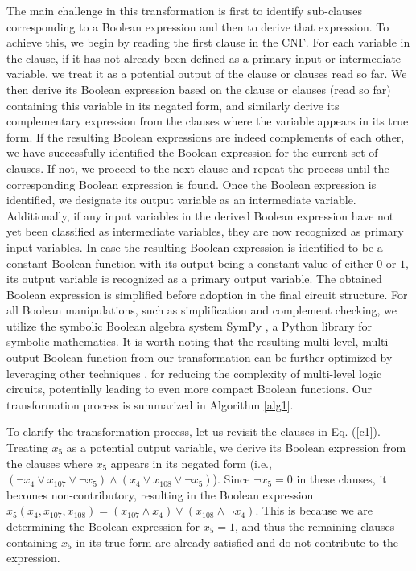 The main challenge in this transformation is first to identify sub-clauses corresponding to a Boolean expression and then to derive that expression. To achieve this, we begin by reading the first clause in the CNF. For each variable in the clause, if it has not already been defined as a primary input or intermediate variable, we treat it as a potential output of the clause or clauses read so far. We then derive its Boolean expression based on the clause or clauses (read so far) containing this variable in its negated form, and similarly derive its complementary expression from the clauses where the variable appears in its true form. If the resulting Boolean expressions are indeed complements of each other, we have successfully identified the Boolean expression for the current set of clauses. If not, we proceed to the next clause and repeat the process until the corresponding Boolean expression is found. Once the Boolean expression is identified, we designate its output variable as an intermediate variable. Additionally, if any input variables in the derived Boolean expression have not yet been classified as intermediate variables, they are now recognized as primary input variables. In case the resulting Boolean expression is identified to be a constant Boolean function with its output being a constant value of either $0$ or $1$, its output variable is recognized as a primary output variable. The obtained Boolean expression is simplified before adoption in the final circuit structure. For all Boolean manipulations, such as simplification and complement checking, we utilize the symbolic Boolean algebra system SymPy \cite{sympy}, a Python library for symbolic mathematics. It is worth noting that the resulting multi-level, multi-output Boolean function from our transformation can be further optimized by leveraging other techniques \cite{Robert2010ABC, Alan2006synthesis, Alan2011synthesis}, for reducing the complexity of multi-level logic circuits, potentially leading to even more compact Boolean functions. Our transformation process is summarized in Algorithm \ref{alg1}.





To clarify the transformation process, let us revisit the clauses in Eq. (\ref{c1}). Treating $x_5$ as a potential output variable, we derive its Boolean expression from the clauses where $x_5$ appears in its negated form (i.e., $(\neg x_4 \vee x_{107} \vee \neg x_5) \wedge (x_4 \vee x_{108} \vee \neg x_5)$). Since $\neg x_5 = 0$ in these clauses, it becomes non-contributory, resulting in the Boolean expression $x_5(x_4, x_{107}, x_{108}) = (x_{107} \wedge x_4) \vee (x_{108} \wedge \neg x_4)$. This is because we are determining the Boolean expression for $x_5 = 1$, and thus the remaining clauses containing $x_5$ in its true form are already satisfied and do not contribute to the expression.


